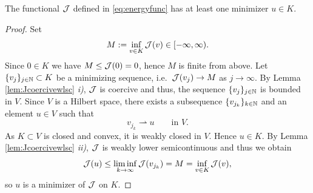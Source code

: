 \begin{proposition}\label{pr:Jex}
	The functional ${\mathcal J}$ defined in \eqref{eq:energyfunc} has at least one minimizer $u\in K$.
\end{proposition}
\begin{proof}
	Set
	\begin{equation*}
		M := \inf_{v\in K}{\mathcal J}(v)\in[-\infty,\infty).
	\end{equation*}
	Since $0\in K$ we have $M\le {\mathcal J}(0)=0$, hence $M$ is finite from above.
	Let $\{v_j\}_{j\in{\mathbb N}}\subset K$ be a minimizing sequence, i.e.\ ${\mathcal J}(v_j)\to M$ as $j\to\infty$. By Lemma \ref{lem:Jcoercivewlsc} {\em i)}, ${\mathcal J}$ is coercive and thus, the sequence $\{v_j\}_{j\in{\mathbb N}}$ is bounded in $V$. Since $V$ is a Hilbert space, there exists a subsequence $\{v_{j_k}\}_{k\in{\mathbb N}}$ and an element $u\in V$ such that
	\begin{equation*}
		v_{j_k} \rightharpoonup u \qquad\text{in } V.
	\end{equation*}
	As $K\subset V$ is closed and convex, it is weakly closed in $V$. Hence $u\in K$. By Lemma \ref{lem:Jcoercivewlsc} {\em ii)}, ${\mathcal J}$ is weakly lower semicontinuous and thus we obtain
	\begin{equation*}
		{\mathcal J}(u)\le \liminf_{k\to\infty}{\mathcal J}(v_{j_k})=M=\inf_{v\in K}{\mathcal J}(v),
	\end{equation*}
	so $u$ is a minimizer of ${\mathcal J}$ on $K$.
\end{proof}

